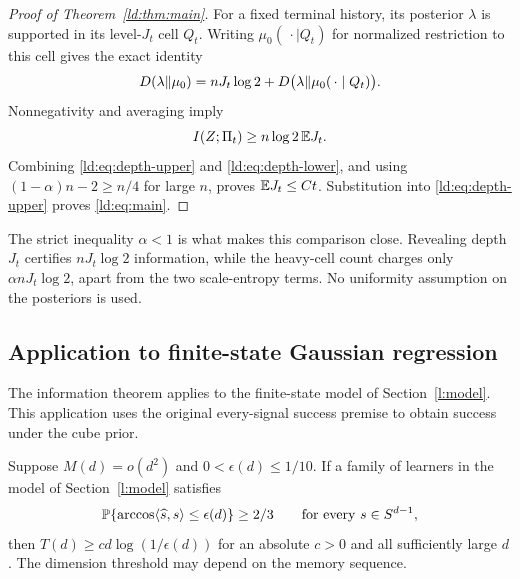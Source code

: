 \begin{proof}[Proof of Theorem~\ref{ld:thm:main}]
For a fixed terminal history, its posterior $\lambda$ is supported
in its level-$J_t$ cell $Q_t$. Writing $\mu_0(\,\cdot\mid Q_t)$
for normalized restriction to this cell gives the exact identity
\[
 D(\lambda\|\mu_0)
 =nJ_t\log2+
 D\bigl(\lambda\|\mu_0(\,\cdot\mid Q_t)\bigr).
\]
Nonnegativity and averaging imply
\begin{equation}\label{ld:eq:depth-lower}
 I(Z;\Pi_t)\ge n\log2\,\mathbb E J_t.
\end{equation}
Combining \eqref{ld:eq:depth-upper} and \eqref{ld:eq:depth-lower}, and
using $(1-\alpha)n-2\ge n/4$ for large $n$, proves
$\mathbb E J_t\le Ct$. Substitution into \eqref{ld:eq:depth-upper} proves
\eqref{ld:eq:main}.
\end{proof}

The strict inequality $\alpha<1$ is what makes this comparison close.
Revealing depth $J_t$ certifies $nJ_t\log2$ information, while the
heavy-cell count charges only $\alpha nJ_t\log2$, apart from the
two scale-entropy terms. No uniformity assumption on the posteriors is
used.

\subsection{Application to finite-state Gaussian regression}\label{ld:sec:learners}

The information theorem applies to the finite-state model of
Section~\ref{l:model}. This application uses the original every-signal
success premise to obtain success under the cube prior.

\begin{corollary}\label{ld:cor:streaming}
Suppose \(M(d)=o(d^2)\) and \(0<\epsilon(d)\le1/10\). If a family of
learners in the model of Section~\ref{l:model} satisfies
\[
 \mathbb P\{\arccos\langle\widehat s,s\rangle\le\epsilon(d)\}
 \ge2/3\qquad\text{for every }s\in S^{d-1},
\]
then \(T(d)\ge c d\log(1/\epsilon(d))\) for an absolute \(c>0\) and
all sufficiently large \(d\). The dimension threshold may depend on
the memory sequence.
\end{corollary}

